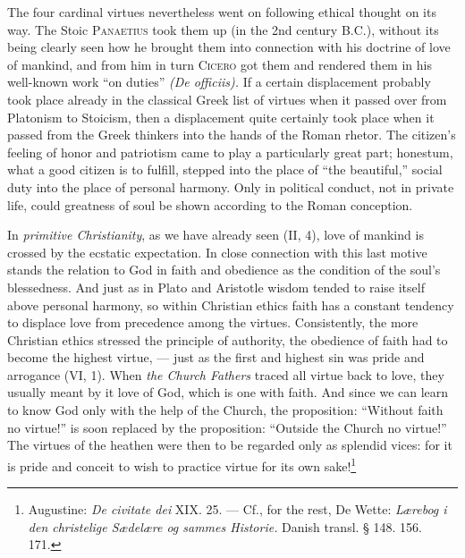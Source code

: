 \documentclass[12pt,a4paper,openany]{book}
\newcommand{\opage}[1]{\marginnote{\footnotesize\textit{[#1]}}}
\begin{document}
The four cardinal virtues nevertheless went on following ethical thought on its way. The Stoic
\textsc{Panaetius} took them up (in the 2nd century B.C.), without its being clearly seen how he brought them into
connection with his doctrine of love of mankind, and from him in turn \textsc{Cicero} got them and rendered them in
his well-known work ``on duties'' \textit{(De officiis).} If a certain displacement probably took place already
in the classical Greek list of virtues when it passed over from Platonism to Stoicism, then a displacement quite
certainly took place when it passed from the Greek thinkers into the hands of the Roman rhetor. The citizen's
feeling of honor and patriotism came to play a particularly great part; honestum, what a good citizen is to
fulfill, stepped into the place of ``the beautiful,'' social duty into the place of personal harmony. Only in
political conduct, not in private life, could greatness of soul be shown according to the Roman conception.

\opage{203}In \textit{primitive Christianity}, as we have already seen (II, 4), love of mankind is crossed by the
ecstatic expectation. In close connection with this last motive stands the relation to God in faith and obedience
as the condition of the soul's blessedness. And just as in Plato and Aristotle wisdom tended to raise itself
above personal harmony, so within Christian ethics faith has a constant tendency to displace love from precedence
among the virtues. Consistently, the more Christian ethics stressed the principle of authority, the obedience of
faith had to become the highest virtue, --- just as the first and highest sin was pride and arrogance (VI, 1).
When \textit{the Church Fathers} traced all virtue back to love, they usually meant by it love of God, which is one
with faith. And since we can learn to know God only with the help of the Church, the proposition: ``Without faith
no virtue!'' is soon replaced by the proposition: ``Outside the Church no virtue!'' The virtues of the heathen
were then to be regarded only as splendid vices: for it is pride and conceit to wish to practice virtue for its
own sake!\footnote[1]{Augustine: \textit{De civitate dei} XIX. 25. --- Cf., for the rest, De Wette:
\textit{Lærebog i den christelige Sædelære og sammes Historie.} Danish transl. § 148. 156. 171.}
\end{document}
